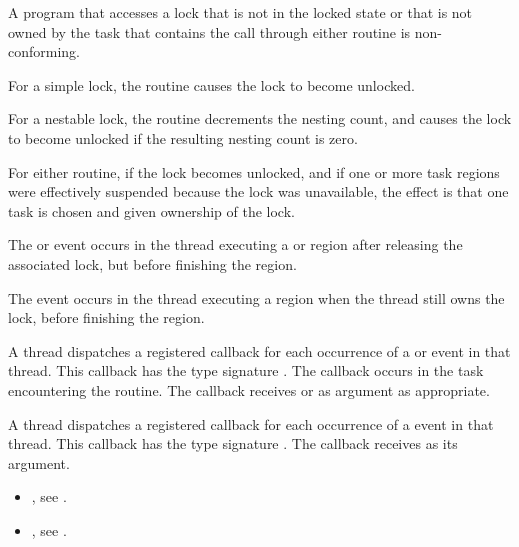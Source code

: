 \constraints
A program that accesses a lock that is not in the locked state or that is 
not owned by the task that contains the call through either routine is 
non-conforming.


\effect
For a simple lock, the  routine causes the lock to become unlocked.

For a nestable lock, the  routine decrements the nesting 
count, and causes the lock to become unlocked if the resulting nesting count is zero.

For either routine, if the lock becomes unlocked, and if one or more task 
regions were effectively suspended because the lock was unavailable, the 
effect is that one task is chosen and given ownership of the lock. 

\events

The  or  event occurs in the thread 
executing a  or  region
after releasing the associated lock, but before finishing the region.

The  event occurs in the thread 
executing a  region
when the thread still owns the lock, 
before finishing the region.


\tools

A thread dispatches a registered 
callback for each occurrence of a  or  event 
in that thread.  This callback has the type signature .
The callback occurs in the task encountering
the routine. The callback receives  or 
  as  argument as appropriate.

A thread dispatches a registered 
callback for each occurrence of a  event 
in that thread. This callback has the type signature .
The callback receives  as its  argument.

\crossreferences
\begin{itemize}
\item {}, see
.
\item {}, see
.
\end{itemize}








